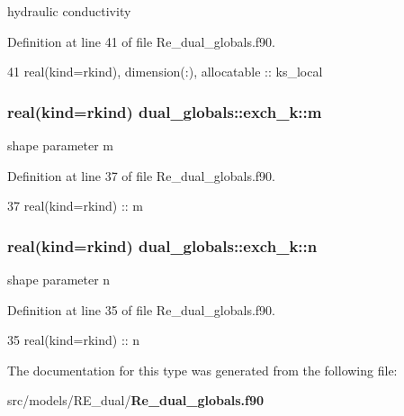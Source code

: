 hydraulic conductivity 



Definition at line 41 of file Re\+\_\+dual\+\_\+globals.\+f90.


\begin{DoxyCode}
41     \textcolor{keywordtype}{real(kind=rkind)}, \textcolor{keywordtype}{dimension(:)}, \textcolor{keywordtype}{allocatable}   :: ks\_local
\end{DoxyCode}
\subsubsection[{m}]{\setlength{\rightskip}{0pt plus 5cm}real(kind=rkind) dual\+\_\+globals\+::exch\+\_\+k\+::m}\label{structdual__globals_1_1exch__k_aff1988e2fda4dd4719139e9a3312b290}


shape parameter m 



Definition at line 37 of file Re\+\_\+dual\+\_\+globals.\+f90.


\begin{DoxyCode}
37     \textcolor{keywordtype}{real(kind=rkind)} :: m
\end{DoxyCode}
\subsubsection[{n}]{\setlength{\rightskip}{0pt plus 5cm}real(kind=rkind) dual\+\_\+globals\+::exch\+\_\+k\+::n}\label{structdual__globals_1_1exch__k_a37177cdf73321e5b36a05b641e831a1d}


shape parameter n 



Definition at line 35 of file Re\+\_\+dual\+\_\+globals.\+f90.


\begin{DoxyCode}
35     \textcolor{keywordtype}{real(kind=rkind)} :: n
\end{DoxyCode}


The documentation for this type was generated from the following file\+:\begin{DoxyCompactItemize}
\item 
src/models/\+R\+E\+\_\+dual/{\bf Re\+\_\+dual\+\_\+globals.\+f90}\end{DoxyCompactItemize}
